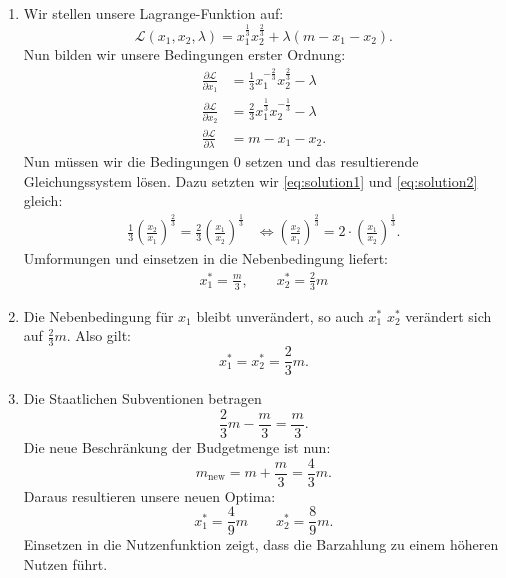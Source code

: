 \begin{solution}
	\begin{enumerate}
		\item Wir stellen unsere Lagrange-Funktion auf:
		      \[
			      \mathcal{L}(x_1, x_2, \lambda) = x_1^{\frac{1}{3}} x_2^{\frac{2}{3}}  + \lambda (m -x_1 -x_2)
			      .\]
		      Nun bilden wir unsere Bedingungen erster Ordnung:
		      \begin{align}
			      \frac{\partial \mathcal{L}}{\partial x_1}     & = \frac{1}{3} x_1^{-\frac{2}{3}} x_2^{\frac{2}{3}} - \lambda \label{eq:solution1} \\
			      \frac{\partial \mathcal{L}}{\partial x_2}     & = \frac{2}{3} x_1^{\frac{1}{3}} x_2^{-\frac{1}{3}} - \lambda \label{eq:solution2} \\
			      \frac{\partial \mathcal{L}}{\partial \lambda} & = m-x_1-x_2
			      .\end{align}
		      Nun müssen wir die Bedingungen $0$ setzen und das resultierende Gleichungssystem lösen. Dazu setzten wir \eqref{eq:solution1} und \eqref{eq:solution2} gleich:
		      \begin{align*}
			      \frac{1}{3} \left(\frac{x_2}{x_1} \right)^{\frac{2}{3}} = \frac{2}{3} \left( \frac{x_1}{x_2} \right)^{\frac{1}{3}} & \iff \left( \frac{x_2}{x_1} \right)^{\frac{2}{3}} = 2\cdot  \left( \frac{x_1}{x_2} \right)^{\frac{1}{3}}
			      .\end{align*}
		      Umformungen und einsetzen in die Nebenbedingung liefert:
		      \begin{align}
			      x_1^* = \frac{m}{3}, \qquad x_2^* =  \frac{2}{3} m
		      \end{align}

		\item Die Nebenbedingung für $x_1$ bleibt unverändert, so auch $x_1^*$ $x_2^*$ verändert sich auf $\frac{2}{3} m$. Also gilt:
		      \[
			      x_1^* = x_2^* = \frac{2}{3} m
			      .\]
		\item Die Staatlichen Subventionen betragen
		      \[
			      \frac{2}{3}m - \frac{m}{3} = \frac{m}{3}
			      .\]
		      Die neue Beschränkung der Budgetmenge ist nun:
		      \[
			      m_{\operatorname{new}} = m+ \frac{m}{3} = \frac{4}{3} m
			      .\]
		      Daraus resultieren unsere neuen Optima:
		      \[
			      x_1^* = \frac{4}{9} m \qquad x_2^* = \frac{8}{9} m
			      .\]
		      Einsetzen in die Nutzenfunktion zeigt, dass die Barzahlung zu einem höheren Nutzen führt.
	\end{enumerate}
\end{solution}


